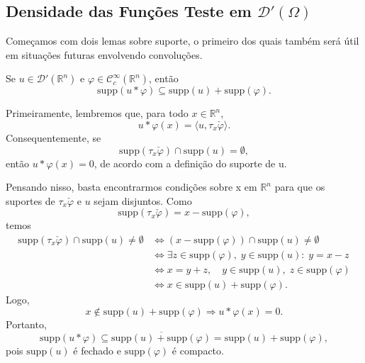 \documentclass[../distribution_theory_notes.tex]{subfiles}
\begin{document}
\subsection{Densidade das Funções Teste em \(\mathcal{D}'(\Omega )\)}
Começamos com dois lemas sobre suporte, o primeiro dos quais também será útil em situações futuras envolvendo convoluções.

\begin{lemma*}
	Se \(u\in \mathcal{D}'(\mathbb{R}^{n})\) e \(\varphi \in \mathcal{C}_{c}^{\infty}(\mathbb{R}^{n})\), então
	\[
		\mathrm{supp}(u*\varphi )\subseteq \mathrm{supp}(u)+\mathrm{supp}(\varphi ).
	\]
\end{lemma*}
\begin{proof*}
	Primeiramente, lembremos que, para todo \(x\in \mathbb{R}^{n}\),
	\[
		u*\varphi (x)=\langle u, \tau_{x}\check{\varphi } \rangle.
	\]
	Consequentemente, se
	\[
		\mathrm{supp}(\tau_{x}\check{\varphi })\cap \mathrm{supp}(u)=\emptyset,
	\]
	então \(u*\varphi (x)=0\), de acordo com a definição do suporte de u.

	Pensando nisso, basta encontrarmos condições sobre x em \(\mathbb{R}^{n}\) para que os suportes de \(\tau_{x}\check{\varphi }\) e \(u\) sejam disjuntos. Como
	\[
		\mathrm{supp}(\tau_{x}\check{\varphi })=x-\mathrm{supp}(\varphi ),
	\]
	temos
	\begin{align*}
		\mathrm{supp}(\tau_{x}\check{\varphi })\cap \mathrm{supp}(u)\neq \emptyset
		 & \Longleftrightarrow (x-\mathrm{supp}(\varphi ))\cap \mathrm{supp}(u)\neq \emptyset         \\
		 & \Longleftrightarrow \exists z\in \mathrm{supp}(\varphi ),\; y\in \mathrm{supp}(u):\; y=x-z \\
		 & \Longleftrightarrow x=y+z,\quad y\in \mathrm{supp}(u),\; z\in \mathrm{supp}(\varphi )      \\
		 & \Longleftrightarrow x\in \mathrm{supp}(u)+\mathrm{supp}(\varphi ).
	\end{align*}
	Logo,
	\[
		x\notin \mathrm{supp}(u)+\mathrm{supp}(\varphi )
		\Longrightarrow u*\varphi (x)=0.
	\]
	Portanto,
	\[
		\mathrm{supp}(u*\varphi )\subseteq \overline{\mathrm{supp}(u)+\mathrm{supp}(\varphi )}
		=\mathrm{supp}(u)+\mathrm{supp}(\varphi ),
	\]
	pois \(\mathrm{supp}(u)\) é fechado e \(\mathrm{supp}(\varphi )\) é compacto. \qedsymbol
\end{proof*}
\end{document}
